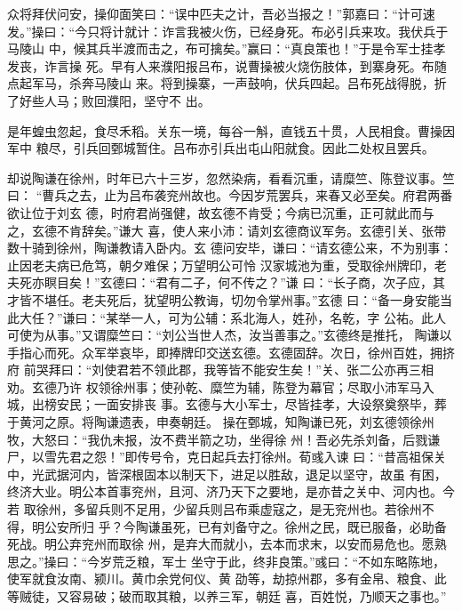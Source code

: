 众将拜伏问安，操仰面笑曰：“误中匹夫之计，吾必当报之！”郭嘉曰：“计可速
发。”操曰：“今只将计就计：诈言我被火伤，已经身死。布必引兵来攻。我伏兵于马陵山
中，候其兵半渡而击之，布可擒矣。”赢曰：“真良策也！”于是令军士挂孝发丧，诈言操
死。早有人来濮阳报吕布，说曹操被火烧伤肢体，到寨身死。布随点起军马，杀奔马陵山
来。将到操寨，一声鼓响，伏兵四起。吕布死战得脱，折了好些人马；败回濮阳，坚守不
出。

是年蝗虫忽起，食尽禾稻。关东一境，每谷一斛，直钱五十贯，人民相食。曹操因军中
粮尽，引兵回鄄城暂住。吕布亦引兵出屯山阳就食。因此二处权且罢兵。

却说陶谦在徐州，时年已六十三岁，忽然染病，看看沉重，请糜竺、陈登议事。竺曰：
“曹兵之去，止为吕布袭兖州故也。今因岁荒罢兵，来春又必至矣。府君两番欲让位于刘玄
德，时府君尚强健，故玄德不肯受；今病已沉重，正可就此而与之，玄德不肯辞矣。”谦大
喜，使人来小沛：请刘玄德商议军务。玄德引关、张带数十骑到徐州，陶谦教请入卧内。玄
德问安毕，谦曰：“请玄德公来，不为别事：止因老夫病已危笃，朝夕难保；万望明公可怜
汉家城池为重，受取徐州牌印，老夫死亦瞑目矣！”玄德曰：“君有二子，何不传之？”谦
曰：“长子商，次子应，其才皆不堪任。老夫死后，犹望明公教诲，切勿令掌州事。”玄德
曰：“备一身安能当此大任？”谦曰：“某举一人，可为公辅：系北海人，姓孙，名乾，字
公祐。此人可使为从事。”又谓糜竺曰：“刘公当世人杰，汝当善事之。”玄德终是推托，
陶谦以手指心而死。众军举哀毕，即捧牌印交送玄德。玄德固辞。次日，徐州百姓，拥挤府
前哭拜曰：“刘使君若不领此郡，我等皆不能安生矣！”关、张二公亦再三相劝。玄德乃许
权领徐州事；使孙乾、糜竺为辅，陈登为幕官；尽取小沛军马入城，出榜安民；一面安排丧
事。玄德与大小军士，尽皆挂孝，大设祭奠祭毕，葬于黄河之原。将陶谦遗表，申奏朝廷。
操在鄄城，知陶谦已死，刘玄德领徐州牧，大怒曰：“我仇未报，汝不费半箭之功，坐得徐
州！吾必先杀刘备，后戮谦尸，以雪先君之怨！”即传号令，克日起兵去打徐州。荀彧入谏
曰：“昔高祖保关中，光武据河内，皆深根固本以制天下，进足以胜敌，退足以坚守，故虽
有困，终济大业。明公本首事兖州，且河、济乃天下之要地，是亦昔之关中、河内也。今若
取徐州，多留兵则不足用，少留兵则吕布乘虚寇之，是无兖州也。若徐州不得，明公安所归
乎？今陶谦虽死，已有刘备守之。徐州之民，既已服备，必助备死战。明公弃兖州而取徐
州，是弃大而就小，去本而求末，以安而易危也。愿熟思之。”操曰：“今岁荒乏粮，军士
坐守于此，终非良策。”彧曰：“不如东略陈地，使军就食汝南、颍川。黄巾余党何仪、黄
劭等，劫掠州郡，多有金帛、粮食、此等贼徒，又容易破；破而取其粮，以养三军，朝廷
喜，百姓悦，乃顺天之事也。”


